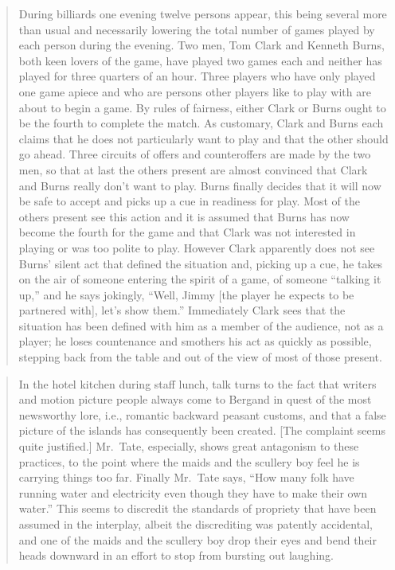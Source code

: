\documentclass[twoside,symmetric,nobib,justified]{tufte-book}
\begin{document}
\begin{quote}
During billiards one evening twelve persons appear, this being several
more than usual and necessarily lowering the total number of games
played by each person during the evening. Two men, Tom Clark and Kenneth
Burns, both keen lovers of the game, have played two games each and
neither has played for three quarters of an hour. Three players who have
only played one game apiece and who are persons other players like to
play with are about to begin a game. By rules of fairness, either Clark
or Burns ought to be the fourth to complete the match. As customary,
Clark and Burns each claims that he does not particularly want to play
and that the other should go ahead. Three circuits of offers and
counteroffers are made by the two men, so that at last the others
present are almost convinced that Clark and Burns really don't want to
play. Burns finally decides that it will now be safe to accept and picks
up a cue in readiness for play. Most of the others present see this
action and it is assumed that Burns has now become the fourth for the
game and that Clark was not interested in playing or was too polite to
play. However Clark apparently does not see Burns' silent act that
defined the situation and, picking up a cue, he takes on the air of
someone entering the spirit of a game, of someone ``talking it up,'' and
he says jokingly, ``Well, Jimmy {[}the player he expects to be partnered
with{]}, let's show them.'' Immediately Clark sees that the situation
has been defined with him as a member of the audience, not as a player;
he loses countenance and smothers his act as quickly as possible,
stepping back from the table and out of the view of most of those
present.
\end{quote}

\begin{quote}
In the hotel kitchen during staff lunch, talk turns to the fact that
writers and motion picture people always come to Bergand in quest of the
most newsworthy lore, i.e., romantic backward peasant customs, and that
a false picture of the islands has consequently been created. {[}The
complaint seems quite justified.{]} Mr.~Tate, especially, shows great
antagonism to these practices, to the point where the maids and the
scullery boy feel he is carrying things too far. Finally Mr.~Tate says,
``How many folk have running water and electricity even though they have
to make their own water.'' This seems to discredit the standards of
propriety that have been assumed in the interplay, albeit the
discrediting was patently accidental, and one of the maids and the
scullery boy drop their eyes and bend their heads downward in an effort
to stop from bursting out laughing.
\end{quote}
\end{document}
